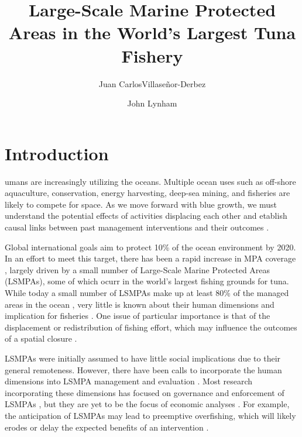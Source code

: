 \documentclass[9p,twocolumn,twoside,lineno]{pnas-new}
\title{Large-Scale Marine Protected Areas in the World's Largest Tuna Fishery}
\author[a,1]{Juan CarlosVillase\~{n}or-Derbez}
\author[b,1]{John Lynham}
\affil[a]{Bren School of Environmental Science \& Management, University of California at Santa Barbara, Santa Barbara, CA}
\affil[b]{Department of Economics, University of Hawaii at Manoa, Honolulu, HI}
\begin{document}
\maketitle
\thispagestyle{firststyle}





\section{Introduction}\label{introduction}

umans are increasingly utilizing the oceans. Multiple ocean uses such as off-shore aquaculture, conservation, energy harvesting, deep-sea mining, and fisheries are likely to compete for space. As we move forward with blue growth, we must understand the potential effects of activities displacing each other and etablish causal links between past management interventions and their outcomes \citep{burgess_2018}.

Global international goals aim to protect 10\% of the ocean environment by 2020. In an effort to meet this target, there has been a rapid increase in MPA coverage \citep{wood_2008,sala_2018}, largely driven by a small number of Large-Scale Marine Protected Areas (LSMPAs), some of which ocurr in the world's largest fishing grounds for tuna. While today a small number of LSMPAs make up at least 80\% of the managed areas in the ocean \citep{toonen_2013}, very little is known about their human dimensions and implication for fisheries \citep{gray_2017}. One issue of particular importance is that of the displacement or redistribution of fishing effort, which may influence the outcomes of a spatial closure \citep{smith_2003}.

LSMPAs were initially assumed to have little social implications due to their general remoteness. However, there have been calls to incorporate the human dimensions into LSMPA management and evaluation \citep{agardy_2011,gray_2017}. Most research incorporating these dimensions has focused on governance and enforcement of LSMPAs \cite{alger_2017,christie_2017}, but they are yet to be the focus of economic analyses \citep{gray_2017}. For example, the anticipation of LSMPAs may lead to preemptive overfishing, which will likely erodes or delay the expected benefits of an intervention \cite{mcdermott_2018}. 
\end{document}
